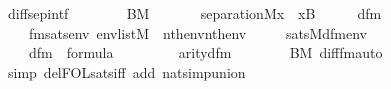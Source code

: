\begin{isabellebody}
%
\endisadelimproof
\isanewline
{}\isamarkupfalse%
\ diff{\isacharunderscore}{\kern0pt}sep{\isacharunderscore}{\kern0pt}intf\ {\isacharcolon}{\kern0pt}\isanewline
\ \ \isanewline
\ \ \ \ {\isachardoublequoteopen}B{\isasymin}M{\isachardoublequoteclose}\isanewline
\ \ \isanewline
\ \ \ \ {\isachardoublequoteopen}separation{\isacharparenleft}{\kern0pt}{\isacharhash}{\kern0pt}{\isacharhash}{\kern0pt}M{\isacharcomma}{\kern0pt}{\isasymlambda}x\ {\isachardot}{\kern0pt}\ x{\isasymnotin}B{\isacharparenright}{\kern0pt}{\isachardoublequoteclose}\isanewline
%
\isadelimproof
%
\endisadelimproof
%
\isatagproof
{}\isamarkupfalse%
\ {\isacharminus}{\kern0pt}\isanewline
\ \ \isamarkupfalse%
\ dfm\ \isanewline
\ \ \ \ fmsats{\isacharcolon}{\kern0pt}{\isachardoublequoteopen}{\isasymAnd}env{\isachardot}{\kern0pt}\ env{\isasymin}list{\isacharparenleft}{\kern0pt}M{\isacharparenright}{\kern0pt}\ {\isasymLongrightarrow}\ nth{\isacharparenleft}{\kern0pt}{}{\isacharcomma}{\kern0pt}env{\isacharparenright}{\kern0pt}{\isasymnotin}nth{\isacharparenleft}{\kern0pt}{}{\isacharcomma}{\kern0pt}env{\isacharparenright}{\kern0pt}\isanewline
\ \ \ \ {\isasymlongleftrightarrow}\ sats{\isacharparenleft}{\kern0pt}M{\isacharcomma}{\kern0pt}dfm{\isacharparenleft}{\kern0pt}{}{\isacharcomma}{\kern0pt}{}{\isacharparenright}{\kern0pt}{\isacharcomma}{\kern0pt}env{\isacharparenright}{\kern0pt}{\isachardoublequoteclose}\isanewline
\ \ \ \ \isanewline
\ \ \ \ {\isachardoublequoteopen}dfm{\isacharparenleft}{\kern0pt}{}{\isacharcomma}{\kern0pt}{}{\isacharparenright}{\kern0pt}\ {\isasymin}\ formula{\isachardoublequoteclose}\isanewline
\ \ \ \ \isanewline
\ \ \ \ {\isachardoublequoteopen}arity{\isacharparenleft}{\kern0pt}dfm{\isacharparenleft}{\kern0pt}{}{\isacharcomma}{\kern0pt}{}{\isacharparenright}{\kern0pt}{\isacharparenright}{\kern0pt}\ {\isacharequal}{\kern0pt}\ {}{\isachardoublequoteclose}\isanewline
\ \ \ \ \isamarkupfalse%
\ {\isacartoucheopen}B{\isasymin}M{\isacartoucheclose}\ diff{\isacharunderscore}{\kern0pt}fm{\isacharunderscore}{\kern0pt}auto\isanewline
\ \ \ \ \isamarkupfalse%
\ {\isacharparenleft}{\kern0pt}simp\ del{\isacharcolon}{\kern0pt}FOL{\isacharunderscore}{\kern0pt}sats{\isacharunderscore}{\kern0pt}iff\ add{\isacharcolon}{\kern0pt}\ nat{\isacharunderscore}{\kern0pt}simp{\isacharunderscore}{\kern0pt}union{\isacharparenright}{\kern0pt}\isanewline

\end{isabellebody}
